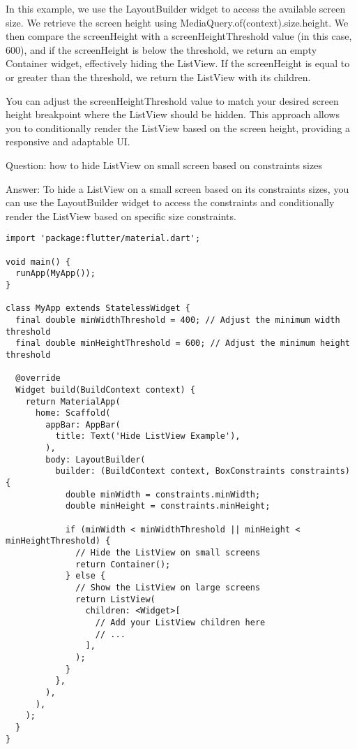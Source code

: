 In this example, we use the LayoutBuilder widget to access the available screen size. We retrieve the screen height 
using MediaQuery.of(context).size.height. We then compare the screenHeight with a screenHeightThreshold value 
(in this case, 600), and if the screenHeight is below the threshold, we return an empty Container widget, 
effectively hiding the ListView. If the screenHeight is equal to or greater than the threshold, we return 
the ListView with its children.

You can adjust the screenHeightThreshold value to match your desired screen height breakpoint where the ListView 
should be hidden. This approach allows you to conditionally render the ListView based on the screen height, 
providing a responsive and adaptable UI.


Question: how to hide ListView on small screen based on constraints sizes

Answer: To hide a ListView on a small screen based on its constraints sizes, you can use the LayoutBuilder widget to 
access the constraints and conditionally render the ListView based on specific size constraints.

\begin{lstlisting}
import 'package:flutter/material.dart';

void main() {
  runApp(MyApp());
}

class MyApp extends StatelessWidget {
  final double minWidthThreshold = 400; // Adjust the minimum width threshold
  final double minHeightThreshold = 600; // Adjust the minimum height threshold

  @override
  Widget build(BuildContext context) {
    return MaterialApp(
      home: Scaffold(
        appBar: AppBar(
          title: Text('Hide ListView Example'),
        ),
        body: LayoutBuilder(
          builder: (BuildContext context, BoxConstraints constraints) {
            double minWidth = constraints.minWidth;
            double minHeight = constraints.minHeight;

            if (minWidth < minWidthThreshold || minHeight < minHeightThreshold) {
              // Hide the ListView on small screens
              return Container();
            } else {
              // Show the ListView on large screens
              return ListView(
                children: <Widget>[
                  // Add your ListView children here
                  // ...
                ],
              );
            }
          },
        ),
      ),
    );
  }
}
\end{lstlisting}

